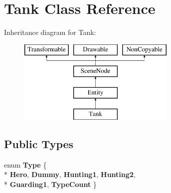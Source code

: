 \hypertarget{class_tank}{}\section{Tank Class Reference}
\label{class_tank}
Inheritance diagram for Tank\+:\begin{figure}[H]
\begin{center}
\leavevmode
\includegraphics[height=4.000000cm]{class_tank}
\end{center}
\end{figure}
\subsection*{Public Types}
\begin{DoxyCompactItemize}
\item 
\hypertarget{class_tank_a9bb1855539f5e229bcdd517c127d34d9}{}enum {\bfseries Type} \{ \\*
{\bfseries Hero}, 
{\bfseries Dummy}, 
{\bfseries Hunting1}, 
{\bfseries Hunting2}, 
\\*
{\bfseries Guarding1}, 
{\bfseries Type\+Count}
 \}\label{class_tank_a9bb1855539f5e229bcdd517c127d34d9}

\end{DoxyCompactItemize}
